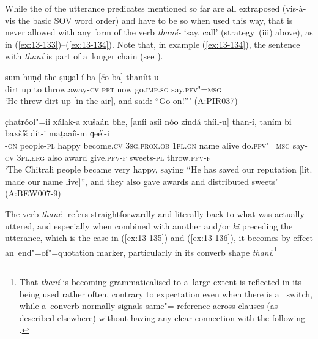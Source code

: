While the  of the utterance predicates mentioned so far are all extraposed (vis-à-vis the basic SOV word order) and have to be so when used this way, that is never allowed with any form of the verb \textit{thané-} `say, call' (strategy~(iii) above), as in (\ref{ex:13-133})--(\ref{ex:13-134}). Note that, in example (\ref{ex:13-134}), the sentence with \textit{thaní} is part of a~longer  chain (see ).

\begin{exe}
\ex
\label{ex:13-133}
\gll sum huṇḍ the ṣuɡal-í ba [čo ba]  thaníit-u \\
dirt up to throw.away-\textsc{cv} \textsc{prt} now go.\textsc{imp.sg} say.\textsc{pfv"=msg} \\
\glt `He threw dirt up [in the air], and said: ``Go on!''' (A:PIR037)

\ex
\label{ex:13-134}
\gll c̣hatróol"=ii xálak-a xušaán bhe,  [aníi asíi nóo zindá thíil-u]
than-í,  taním bi baxšíš dít-i maṭaaíi-m   ɡeél-i \\
-\textsc{gn} people-\textsc{pl} happy become.\textsc{cv}  \textsc{3sg.prox.ob } \textsc{1pl.gn} name alive do.\textsc{pfv"=msg} say-\textsc{cv}  \textsc{3pl.erg} also award give.\textsc{pfv-f} sweets-\textsc{pl} throw.\textsc{pfv-f}  \\
\glt `The Chitrali people became very happy, saying ``He has saved our reputation [lit. made our name live]'', and they also gave awards and distributed sweets' (A:BEW007-9) 
\end{exe}

The verb \textit{thané-} refers straightforwardly and literally back to what was actually uttered,
and especially when combined with another  and/or \textit{ki} preceding the
utterance, which is the case in (\ref{ex:13-135}) and (\ref{ex:13-136}), it becomes by effect
an~end"=of"=quotation marker, particularly in its converb shape \textit{thaní}.\footnote{That
  \textit{thaní} is becoming grammaticalised to a~large extent is reflected in its being used rather
  often, contrary to expectation even when there is a~ switch, while a~converb normally
  signals same"= reference across clauses (as described elsewhere) without having any clear
  connection with the following .}

